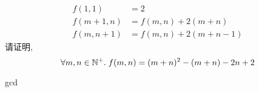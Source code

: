 \begin{frame}{}
  \begin{exampleblock}{}
    \begin{align*}
      f(1, 1) &= 2 \\
      f(m+1, n) &= f(m,n) + 2(m+n) \\
      f(m, n+1) &= f(m,n) + 2(m+n-1)
    \end{align*}
    请证明,
    \[
      \forall m, n \in \mathbb{N}^{+}.\; f(m,n) = (m+n)^{2} - (m+n) - 2n + 2
    \]
  \end{exampleblock}

  \pause
  \begin{center}
  \end{center}
\end{frame}

\begin{frame}{}
  gcd
\end{frame}
